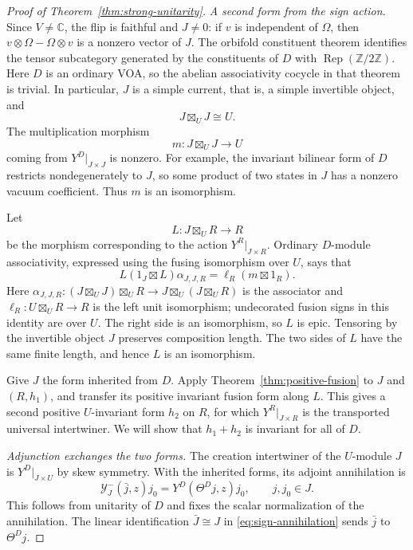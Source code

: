 \begin{proof}[Proof of Theorem~\ref{thm:strong-unitarity}]
\smallskip
\noindent\emph{A second form from the sign action.}
Since $V\ne\mathbb C$, the flip is faithful and $J\ne0$: if $v$ is
independent of $\Omega$, then $v\otimes\Omega-\Omega\otimes v$ is a
nonzero vector of $J$. The orbifold constituent theorem
\cite[Corollary~4.8]{McRaeOrbifold} identifies the tensor subcategory
generated by the constituents of $D$ with
$\operatorname{Rep}(\mathbb Z/2\mathbb Z)$. Here $D$ is an ordinary
VOA, so the abelian associativity cocycle in that theorem is trivial.
In particular, $J$ is a simple current, that is, a simple invertible
object, and
\[
 J\boxtimes_U J\cong U.
\]
The multiplication morphism
\[
 m:J\boxtimes_U J\longrightarrow U
\]
coming from $Y^D|_{J\times J}$ is nonzero. For example, the invariant
bilinear form of $D$ restricts nondegenerately to $J$, so some product
of two states in $J$ has a nonzero vacuum coefficient. Thus $m$ is an
isomorphism.

Let
\[
 L:J\boxtimes_U R\longrightarrow R
\]
be the morphism corresponding to the action $Y^R|_{J\times R}$.
Ordinary $D$-module associativity, expressed using the fusing
isomorphism over $U$, says that
\begin{equation}\label{eq:sign-action-square}
 L(1_J\boxtimes L)\alpha_{J,J,R}
   =\ell_R(m\boxtimes1_R).
\end{equation}
Here $\alpha_{J,J,R}:(J\boxtimes_U J)\boxtimes_U R
\longrightarrow J\boxtimes_U(J\boxtimes_U R)$ is the associator and
$\ell_R:U\boxtimes_U R\longrightarrow R$ is the left unit
isomorphism; undecorated fusion signs in this identity are over $U$.
The right side is an isomorphism, so $L$ is epic. Tensoring by the
invertible object $J$ preserves composition length. The two sides of
$L$ have the same finite length, and hence $L$ is an isomorphism.

Give $J$ the form inherited from $D$. Apply
Theorem~\ref{thm:positive-fusion} to $J$ and $(R,h_1)$, and transfer
its positive invariant fusion form along $L$. This gives a second
positive $U$-invariant form $h_2$ on $R$, for which
$Y^R|_{J\times R}$ is the transported universal intertwiner. We will
show that $h_1+h_2$ is invariant for all of $D$.

\smallskip
\noindent\emph{Adjunction exchanges the two forms.}
The creation intertwiner of the $U$-module $J$ is
$Y^D|_{J\times U}$ by skew symmetry. With the inherited forms, its
adjoint annihilation is
\begin{equation}\label{eq:sign-annihilation}
 \mathcal Y_J^-(\bar j,z)j_0
       =Y^D(\Theta^D j,z)j_0,
 \qquad j,j_0\in J.
\end{equation}
This follows from unitarity of $D$ and fixes the scalar normalization
of the annihilation. The linear identification $\bar J\cong J$ in
\eqref{eq:sign-annihilation} sends $\bar j$ to $\Theta^D j$.


\end{proof}
